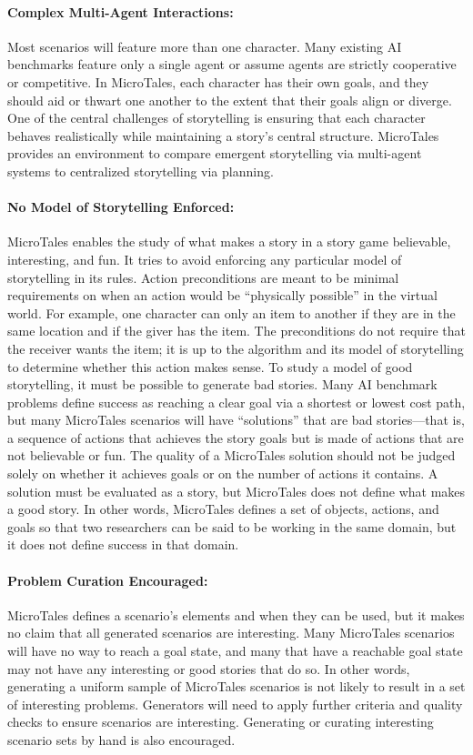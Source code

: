 \documentclass{nilreport}
\begin{document}
\paragraph{Complex Multi-Agent Interactions:} Most scenarios will feature more than one character. Many existing AI benchmarks feature only a single agent or assume agents are strictly cooperative or competitive. In MicroTales, each character has their own goals, and they should aid or thwart one another to the extent that their goals align or diverge. One of the central challenges of storytelling is ensuring that each character behaves realistically while maintaining a story's central structure. MicroTales provides an environment to compare emergent storytelling via multi-agent systems to centralized storytelling via planning.

\paragraph{No Model of Storytelling Enforced:} MicroTales enables the study of what makes a story in a story game believable, interesting, and fun. It tries to avoid enforcing any particular model of storytelling in its rules. Action preconditions are meant to be minimal requirements on when an action would be ``physically possible'' in the virtual world. For example, one character can only  an item to another if they are in the same location and if the giver has the item. The preconditions do not require that the receiver wants the item; it is up to the algorithm and its model of storytelling to determine whether this action makes sense. To study a model of good storytelling, it must be possible to generate bad stories. Many AI benchmark problems define success as reaching a clear goal via a shortest or lowest cost path, but many MicroTales scenarios will have ``solutions'' that are bad stories---that is, a sequence of actions that achieves the story goals but is made of actions that are not believable or fun. The quality of a MicroTales solution should not be judged solely on whether it achieves goals or on the number of actions it contains. A solution must be evaluated as a story, but MicroTales does not define what makes a good story. In other words, MicroTales defines a set of objects, actions, and goals so that two researchers can be said to be working in the same domain, but it does not define success in that domain.

\paragraph{Problem Curation Encouraged:} MicroTales defines a scenario's elements and when they can be used, but it makes no claim that all generated scenarios are interesting. Many MicroTales scenarios will have no way to reach a goal state, and many that have a reachable goal state may not have any interesting or good stories that do so. In other words, generating a uniform sample of MicroTales scenarios is not likely to result in a set of interesting problems. Generators will need to apply further criteria and quality checks to ensure scenarios are interesting. Generating or curating interesting scenario sets by hand is also encouraged.
\end{document}
